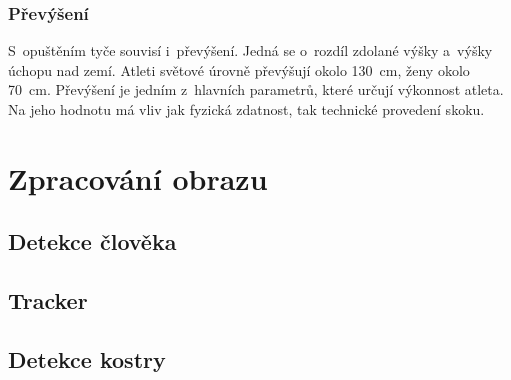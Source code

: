 \subsubsection{Převýšení}

S~opuštěním tyče souvisí i~převýšení. Jedná se o~rozdíl zdolané výšky a~výšky úchopu nad zemí. Atleti světové úrovně převýšují okolo 130~cm, ženy okolo 70~cm. Převýšení je jedním z~hlavních parametrů, které určují výkonnost atleta. Na jeho hodnotu má vliv jak fyzická zdatnost, tak technické provedení skoku.

\section{Zpracování obrazu}

\subsection{Detekce člověka}

\subsection{Tracker}

\subsection{Detekce kostry}









































